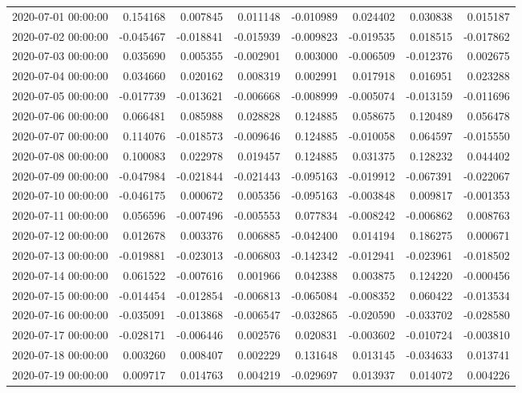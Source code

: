 \begin{tabular}{lrrrrrrr}
2020-07-01 00:00:00 & 0.154168 & 0.007845 & 0.011148 & -0.010989 & 0.024402 & 0.030838 & 0.015187 \\
2020-07-02 00:00:00 & -0.045467 & -0.018841 & -0.015939 & -0.009823 & -0.019535 & 0.018515 & -0.017862 \\
2020-07-03 00:00:00 & 0.035690 & 0.005355 & -0.002901 & 0.003000 & -0.006509 & -0.012376 & 0.002675 \\
2020-07-04 00:00:00 & 0.034660 & 0.020162 & 0.008319 & 0.002991 & 0.017918 & 0.016951 & 0.023288 \\
2020-07-05 00:00:00 & -0.017739 & -0.013621 & -0.006668 & -0.008999 & -0.005074 & -0.013159 & -0.011696 \\
2020-07-06 00:00:00 & 0.066481 & 0.085988 & 0.028828 & 0.124885 & 0.058675 & 0.120489 & 0.056478 \\
2020-07-07 00:00:00 & 0.114076 & -0.018573 & -0.009646 & 0.124885 & -0.010058 & 0.064597 & -0.015550 \\
2020-07-08 00:00:00 & 0.100083 & 0.022978 & 0.019457 & 0.124885 & 0.031375 & 0.128232 & 0.044402 \\
2020-07-09 00:00:00 & -0.047984 & -0.021844 & -0.021443 & -0.095163 & -0.019912 & -0.067391 & -0.022067 \\
2020-07-10 00:00:00 & -0.046175 & 0.000672 & 0.005356 & -0.095163 & -0.003848 & 0.009817 & -0.001353 \\
2020-07-11 00:00:00 & 0.056596 & -0.007496 & -0.005553 & 0.077834 & -0.008242 & -0.006862 & 0.008763 \\
2020-07-12 00:00:00 & 0.012678 & 0.003376 & 0.006885 & -0.042400 & 0.014194 & 0.186275 & 0.000671 \\
2020-07-13 00:00:00 & -0.019881 & -0.023013 & -0.006803 & -0.142342 & -0.012941 & -0.023961 & -0.018502 \\
2020-07-14 00:00:00 & 0.061522 & -0.007616 & 0.001966 & 0.042388 & 0.003875 & 0.124220 & -0.000456 \\
2020-07-15 00:00:00 & -0.014454 & -0.012854 & -0.006813 & -0.065084 & -0.008352 & 0.060422 & -0.013534 \\
2020-07-16 00:00:00 & -0.035091 & -0.013868 & -0.006547 & -0.032865 & -0.020590 & -0.033702 & -0.028580 \\
2020-07-17 00:00:00 & -0.028171 & -0.006446 & 0.002576 & 0.020831 & -0.003602 & -0.010724 & -0.003810 \\
2020-07-18 00:00:00 & 0.003260 & 0.008407 & 0.002229 & 0.131648 & 0.013145 & -0.034633 & 0.013741 \\
2020-07-19 00:00:00 & 0.009717 & 0.014763 & 0.004219 & -0.029697 & 0.013937 & 0.014072 & 0.004226 \\

\end{tabular}
